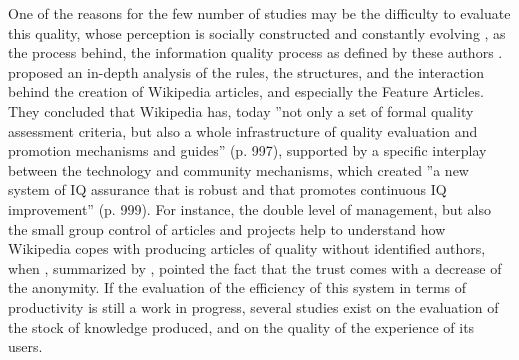 One of the reasons for the few number of studies may be the difficulty
to evaluate this quality, whose perception is socially constructed
and constantly evolving \citep{Stviliaetal08,Stviliaetal09}, as the
process behind, the information quality process as defined by these
authors \citep{StviliaGasser08}. \citet{Stviliaetal08} proposed
an in-depth analysis of the rules, the structures, and the interaction
behind the creation of Wikipedia articles, and especially the Feature
Articles. They concluded that Wikipedia has, today ''not only a set
of formal quality assessment criteria, but also a whole infrastructure
of quality evaluation and promotion mechanisms and guides'' (p. 997),
supported by a specific interplay between the technology and community
mechanisms, which created ''a new system of IQ assurance that is
robust and that promotes continuous IQ improvement'' (p. 999). For
instance, the double level of management, but also the small group
control of articles and projects help to understand how Wikipedia
copes with producing articles of quality without identified authors,
when \citep{Miller05}, summarized by \citet{deLaat10}, pointed the
fact that the trust comes with a decrease of the anonymity.  If the
evaluation of the efficiency of this system in terms of productivity
is still a work in progress, several studies exist on the evaluation
of the stock of knowledge produced, and on the quality of the experience
of its users. 